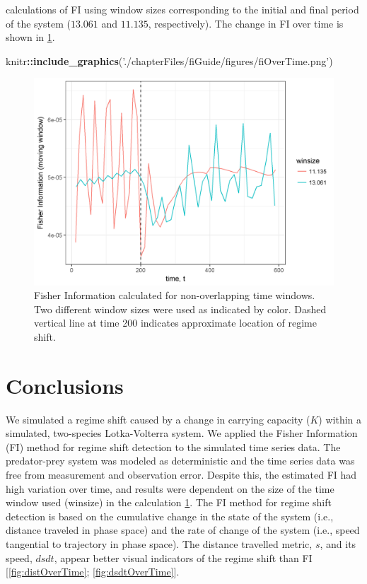 \documentclass[12pt,twoside,openany]{reedthesis}
\newenvironment{Shaded}{\begin{snugshade}}{\end{snugshade}}
\newcommand{\KeywordTok}[1]{\textcolor[rgb]{0.13,0.29,0.53}{\textbf{#1}}}
\newcommand{\StringTok}[1]{\textcolor[rgb]{0.31,0.60,0.02}{#1}}
\newcommand{\OperatorTok}[1]{\textcolor[rgb]{0.81,0.36,0.00}{\textbf{#1}}}
\newcommand{\NormalTok}[1]{#1}
\begin{document}
calculations of FI using window sizes corresponding to the initial and
final period of the system (\(13.061\) and \(11.135\), respectively).
The change in FI over time is shown in \ref{fig:fiOverTime}.
\begin{Shaded}
\begin{Highlighting}[]
\NormalTok{knitr}\OperatorTok{::}\KeywordTok{include_graphics}\NormalTok{(}\StringTok{'./chapterFiles/fiGuide/figures/fiOverTime.png'}\NormalTok{)}
\end{Highlighting}
\end{Shaded}
\begin{figure}
\includegraphics[width=27.08in]{./chapterFiles/fiGuide/figures/fiOverTime} \caption{Fisher Information calculated for non-overlapping time windows. Two different window sizes were used as indicated by color. Dashed vertical line at time 200 indicates approximate location of regime shift.}\label{fig:fiOverTime}
\end{figure}
\section{Conclusions}\label{conclusions-1}

We simulated a regime shift caused by a change in carrying capacity
(\(K\)) within a simulated, two-species Lotka-Volterra system. We
applied the Fisher Information (FI) method for regime shift detection to
the simulated time series data. The predator-prey system was modeled as
deterministic and the time series data was free from measurement and
observation error. Despite this, the estimated FI had high variation
over time, and results were dependent on the size of the time window
used (winsize) in the calculation \ref{fig:fiOverTime}. The FI method
for regime shift detection is based on the cumulative change in the
state of the system (i.e., distance traveled in phase space) and the
rate of change of the system (i.e., speed tangential to trajectory in
phase space). The distance travelled metric, \(s\), and its speed,
\(dsdt\), appear better visual indicators of the regime shift than FI
{[}\ref{fig:distOverTime}; \ref{fig:dsdtOverTime}{]}.
\end{document}
